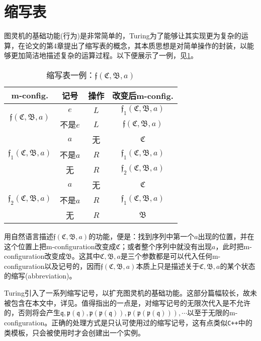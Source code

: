 \documentclass[8pt]{article}
\begin{document}
\section{缩写表}

图灵机的基础功能(行为)是非常简单的，Turing为了能够让其实现更为复杂的运算，在论文的第4章提出了缩写表的概念，其本质思想是对简单操作的封装，以能够更加简洁地描述复杂的运算过程。以下便展示了一例，见\cref{table_f}。

\begin{table}[h]
	\centering
	\begin{tabular}{cc|cc}
		m-config. & 记号 & 操作 & 改变后m-config.\\
		\hline
		\multirow{2}{*}{$\mathfrak f(\mathfrak C, \mathfrak B, a)$} 
		& $e$ & $L$ & $\mathfrak f_1(\mathfrak C, \mathfrak B, a)$\\
		& 不是$e$ & $L$ & $\mathfrak f(\mathfrak C, \mathfrak B, a)$\\
		\hline
		\multirow{3}{*}{$\mathfrak f_1(\mathfrak C, \mathfrak B, a)$} 
		& $a$ & 无 & $\mathfrak C$\\
		& 不是$a$ & $R$ & $\mathfrak f_1(\mathfrak C, \mathfrak B, a)$\\
		& 无 & $R$ & $\mathfrak f_2(\mathfrak C, \mathfrak B, a)$\\
		\hline
		\multirow{3}{*}{$\mathfrak f_2(\mathfrak C, \mathfrak B, a)$}
		& $a$ & 无 & $\mathfrak C$\\
		& 不是$a$ & $R$ & $\mathfrak f_1(\mathfrak C, \mathfrak B, a)$\\
		& 无 & $R$ & $\mathfrak B$\\
	\end{tabular}
	\caption{缩写表一例：$\mathfrak f(\mathfrak C, \mathfrak B, a)$}
	\label{table_f}
\end{table}

用自然语言描述$\mathfrak f(\mathfrak C, \mathfrak B, a)$的功能，便是：找到序列中第一个$a$出现的位置，并在这个位置上把m-configuration改变成$\mathfrak C$；或者整个序列中就没有出现$a$，此时把m-configuration改变成$\mathfrak B$。这其中$\mathfrak C, \mathfrak B, a$是三个参数都是可以代入任何m-configuration以及记号的，因而$\mathfrak f(\mathfrak C, \mathfrak B, a)$本质上只是描述关于$\mathfrak C, \mathfrak B, a$的某个状态的缩写(abbreviation)。

Turing引入了一系列缩写记号，以扩充图灵机的基础功能。这部分篇幅较长，故未被包含在本文中，详见\cite{Turing}。值得指出的一点是，对缩写记号的无限次代入是不允许的，否则将会产生$\mathfrak q, \mathfrak p(\mathfrak q), \mathfrak p\left(\mathfrak p(\mathfrak q)\right), \mathfrak p\left(\mathfrak p\left(\mathfrak p(\mathfrak q)\right)\right), \cdots$以至于无限的m-configuration。正确的处理方式是只认可使用过的缩写记号，这有点类似\texttt{C++}中的类模板，只会被使用时才会创建出一个实例。
\end{document}
